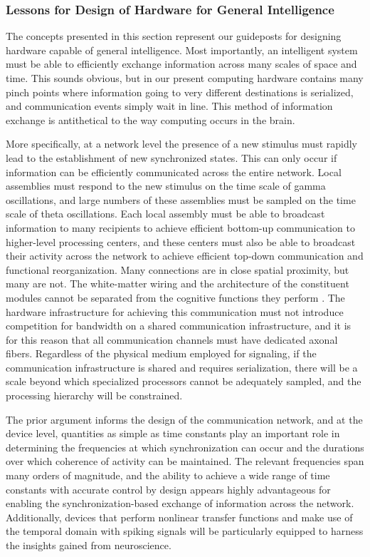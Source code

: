 \subsubsection{Lessons for Design of Hardware for General Intelligence}
The concepts presented in this section represent our guideposts for designing hardware capable of general intelligence. Most importantly, an intelligent system must be able to efficiently exchange information across many scales of space and time. This sounds obvious, but in our present computing hardware contains many pinch points where information going to very different destinations is serialized, and communication events simply wait in line. This method of information exchange is antithetical to the way computing occurs in the brain.

More specifically, at a network level the presence of a new stimulus must rapidly lead to the establishment of new synchronized states. This can only occur if information can be efficiently communicated across the entire network. Local assemblies must respond to the new stimulus on the time scale of gamma oscillations, and large numbers of these assemblies must be sampled on the time scale of theta oscillations. Each local assembly must be able to broadcast information to many recipients to achieve efficient bottom-up communication to higher-level processing centers, and these centers must also be able to broadcast their activity across the network to achieve efficient top-down communication and functional reorganization. Many connections are in close spatial proximity, but many are not. The white-matter wiring and the architecture of the constituent modules cannot be separated from the cognitive functions they perform \cite{bosp2015}. The hardware infrastructure for achieving this communication must not introduce competition for bandwidth on a shared communication infrastructure, and it is for this reason that all communication channels must have dedicated axonal fibers. Regardless of the physical medium employed for signaling, if the communication infrastructure is shared and requires serialization, there will be a scale beyond which specialized processors cannot be adequately sampled, and the processing hierarchy will be constrained.

The prior argument informs the design of the communication network, and at the device level, quantities as simple as time constants play an important role in determining the frequencies at which synchronization can occur and the durations over which coherence of activity can be maintained. The relevant frequencies span many orders of magnitude, and the ability to achieve a wide range of time constants with accurate control by design appears highly advantageous for enabling the synchronization-based exchange of information across the network. Additionally, devices that perform nonlinear transfer functions and make use of the temporal domain with spiking signals will be particularly equipped to harness the insights gained from neuroscience. 

